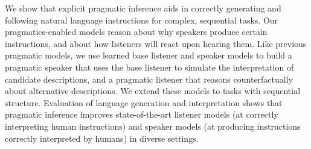 We show that explicit pragmatic inference aids in correctly generating and following natural language instructions for complex, sequential tasks.  Our pragmatics-enabled models reason about why speakers produce certain instructions, and about how listeners will react upon hearing them.  Like previous pragmatic models, we use learned base listener and speaker models to build a pragmatic speaker that uses the base listener to simulate the interpretation of candidate descriptions, and a pragmatic listener that reasons counterfactually about alternative descriptions. We extend these models to tasks with sequential structure.  Evaluation of language generation and interpretation shows that pragmatic inference improves state-of-the-art listener models (at correctly interpreting human instructions) and speaker models (at producing instructions correctly interpreted by humans) in diverse settings.
